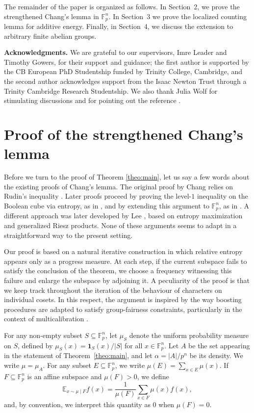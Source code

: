 \documentclass[11pt,reqno]{amsart}
\theoremstyle{plain}
\theoremstyle{remark}
\begin{document}
The remainder of the paper is organized as follows. In Section~2, we prove the strengthened Chang's lemma in $\mathbb F_p^n$.  In Section~3 we prove the
localized counting lemma for additive energy. Finally, in Section~4, we discuss the extension to
arbitrary finite abelian groups. 

\medskip

\textbf{Acknowledgments.}
We are grateful to our supervisors, Imre Leader and Timothy Gowers, for their support and guidance; the first author is supported by the CB European PhD Studentship funded by Trinity College, Cambridge, and the second author acknowledges support from the Isaac Newton Trust through a Trinity Cambridge Research Studentship.
We also thank Julia Wolf for stimulating discussions and for pointing out the reference \cite{Lee2017LargeSpectrum}.


\section{Proof of the strengthened Chang's lemma}
Before we turn to the proof of Theorem \ref{theo:main}, let us say a few words about the existing proofs of Chang’s lemma.
The original proof by Chang relies on Rudin's inequality \cite{Chang2002}. Later proofs proceed by proving the level-$1$ inequality on the Boolean cube via entropy, as in \cite{impagliazzo2014entropic}, and by extending this argument to $\mathbb{F}_p^n$, as in \cite{WigdersonAlmostPeriodicity}. A different approach was later developed by Lee \cite{Lee2017LargeSpectrum}, based on entropy maximization and generalized Riesz products. None of these arguments seems to adapt in a straightforward way to the present setting. 

Our proof is based on a natural iterative construction in which relative entropy appears only as a progress measure. At each step, if the current subspace fails to satisfy the conclusion of the theorem, we choose a frequency witnessing this failure and enlarge the subspace by adjoining it. A peculiarity of the proof is that we keep track throughout the iteration of the behaviour of characters on individual cosets. In this respect, the argument is inspired by the way boosting procedures are adapted to satisfy group-fairness constraints, particularly in the context of multicalibration \cite{HebertJohnsonKimReingoldRothblum2018}.

 For any non-empty subset $S \subseteq \mathbb{F}_p^n$, let $\mu_S$ denote the uniform probability measure on $S$, defined by $\mu_S(x)=\mathbf{1}_S(x)/|S|$ for all $x \in \mathbb{F}_p^n$. Let $A$ be the set appearing in the statement of Theorem~\ref{theo:main}, and let $\alpha=|A|/p^n$ be its density. We write $\mu=\mu_A$. For any subset $E\subseteq \mathbb{F}_p^n$, we write $\mu(E)=\sum_{x\in E}\mu(x)$. If $F\subseteq \mathbb{F}_p^n$ is an affine subspace and $\mu(F)>0$, we define
$$
\mathbb{E}_{x\sim\mu\mid F} f(x)
=
\frac{1}{\mu(F)}\sum_{x\in F}\mu(x)f(x),
$$
and, by convention, we interpret this quantity as $0$ when $\mu(F)=0$.
\end{document}
